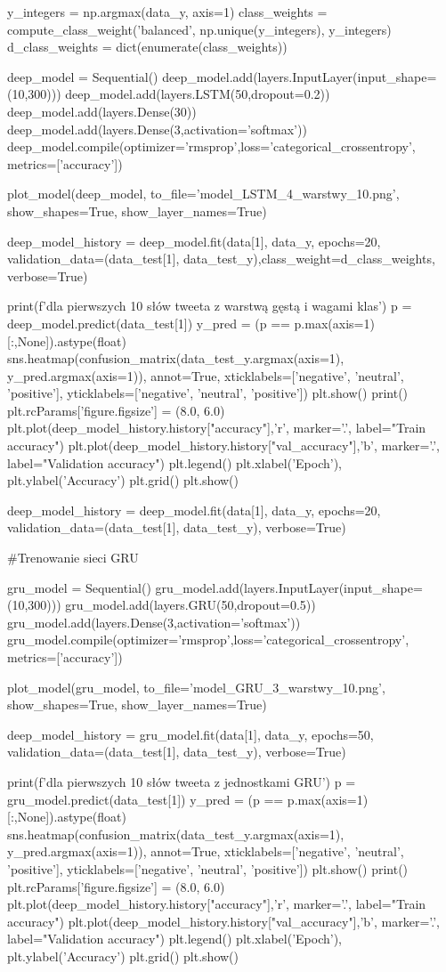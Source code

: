 \documentclass[11pt, a4paper, notitlepage]{report}
\begin{document}
\begin{appendices}
\begin{spverbatim}
y_integers = np.argmax(data_y, axis=1)
class_weights = compute_class_weight('balanced', np.unique(y_integers), y_integers)
d_class_weights = dict(enumerate(class_weights))

deep_model = Sequential()
deep_model.add(layers.InputLayer(input_shape=(10,300)))
deep_model.add(layers.LSTM(50,dropout=0.2))
deep_model.add(layers.Dense(30))
deep_model.add(layers.Dense(3,activation='softmax'))
deep_model.compile(optimizer='rmsprop',loss='categorical_crossentropy', metrics=['accuracy'])

plot_model(deep_model, to_file='model_LSTM_4_warstwy_10.png', show_shapes=True, show_layer_names=True)

deep_model_history = deep_model.fit(data[1], data_y, epochs=20, validation_data=(data_test[1], data_test_y),class_weight=d_class_weights, verbose=True)

print(f'\nModel dla pierwszych 10 słów tweeta z warstwą gęstą i wagami klas\n')
p = deep_model.predict(data_test[1])
y_pred = (p == p.max(axis=1)[:,None]).astype(float)
sns.heatmap(confusion_matrix(data_test_y.argmax(axis=1), y_pred.argmax(axis=1)), annot=True, xticklabels=['negative', 'neutral', 'positive'], yticklabels=['negative', 'neutral', 'positive'])
plt.show()
print()
plt.rcParams['figure.figsize'] = (8.0, 6.0)
plt.plot(deep_model_history.history["accuracy"],'r', marker='.', label="Train accuracy")
plt.plot(deep_model_history.history["val_accuracy"],'b', marker='.', label="Validation accuracy")
plt.legend()
plt.xlabel('Epoch'), plt.ylabel('Accuracy')
plt.grid()
plt.show()

deep_model_history = deep_model.fit(data[1], data_y, epochs=20, validation_data=(data_test[1], data_test_y), verbose=True)

#Trenowanie sieci GRU

gru_model = Sequential()
gru_model.add(layers.InputLayer(input_shape=(10,300)))
gru_model.add(layers.GRU(50,dropout=0.5))
gru_model.add(layers.Dense(3,activation='softmax'))
gru_model.compile(optimizer='rmsprop',loss='categorical_crossentropy', metrics=['accuracy'])

plot_model(gru_model, to_file='model_GRU_3_warstwy_10.png', show_shapes=True, show_layer_names=True)

deep_model_history = gru_model.fit(data[1], data_y, epochs=50, validation_data=(data_test[1], data_test_y), verbose=True)

print(f'\nModel dla pierwszych 10 słów tweeta z jednostkami GRU\n')
p = gru_model.predict(data_test[1])
y_pred = (p == p.max(axis=1)[:,None]).astype(float)
sns.heatmap(confusion_matrix(data_test_y.argmax(axis=1), y_pred.argmax(axis=1)), annot=True, xticklabels=['negative', 'neutral', 'positive'], yticklabels=['negative', 'neutral', 'positive'])
plt.show()
print()
plt.rcParams['figure.figsize'] = (8.0, 6.0)
plt.plot(deep_model_history.history["accuracy"],'r', marker='.', label="Train accuracy")
plt.plot(deep_model_history.history["val_accuracy"],'b', marker='.', label="Validation accuracy")
plt.legend()
plt.xlabel('Epoch'), plt.ylabel('Accuracy')
plt.grid()
plt.show()


\end{spverbatim}
\end{appendices}
\end{document}
